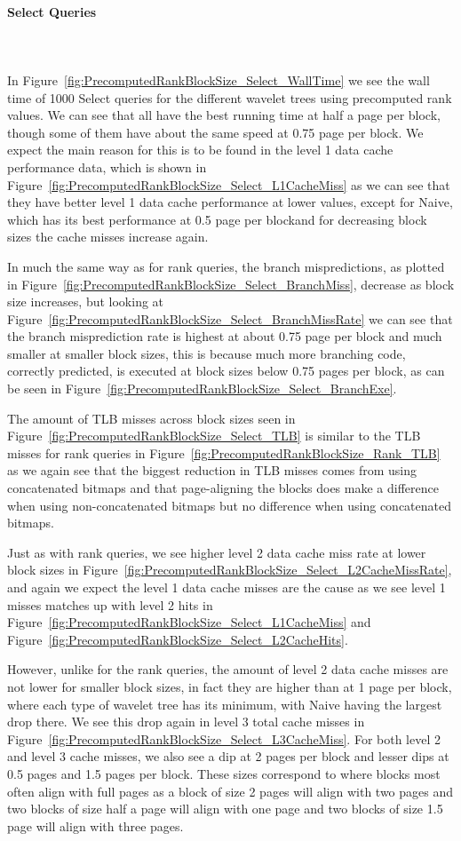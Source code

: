 \paragraph{Select Queries}~\\\\
In Figure~\ref{fig:PrecomputedRankBlockSize_Select_WallTime} we see the wall time of 1000 Select queries for the different wavelet trees using precomputed rank values.
We can see that all have the best running time at half a page per block, though some of them have about the same speed at 0.75 page per block.
We expect the main reason for this is to be found in the level 1 data cache performance data, which is shown in Figure~\ref{fig:PrecomputedRankBlockSize_Select_L1CacheMiss} as we can see that they have better level 1 data cache performance at lower values, except for Naive, which has its best performance at 0.5 page per blockand for decreasing block sizes the cache misses increase again.

In much the same way as for rank queries, the branch mispredictions, as plotted in Figure~\ref{fig:PrecomputedRankBlockSize_Select_BranchMiss}, decrease as block size increases, but looking at Figure~\ref{fig:PrecomputedRankBlockSize_Select_BranchMissRate} we can see that the branch misprediction rate is highest at about 0.75 page per block and much smaller at smaller block sizes, this is because much more branching code, correctly predicted, is executed at block sizes below 0.75 pages per block, as can be seen in Figure~\ref{fig:PrecomputedRankBlockSize_Select_BranchExe}.

The amount of TLB misses across block sizes seen in Figure~\ref{fig:PrecomputedRankBlockSize_Select_TLB} is similar to the TLB misses for rank queries in Figure~\ref{fig:PrecomputedRankBlockSize_Rank_TLB} as we again see that the biggest reduction in TLB misses comes from using concatenated bitmaps and that page-aligning the blocks does make a difference when using non-concatenated bitmaps but no difference when using concatenated bitmaps.

Just as with rank queries, we see higher level 2 data cache miss rate at lower block sizes in Figure~\ref{fig:PrecomputedRankBlockSize_Select_L2CacheMissRate}, and again we expect the level 1 data cache misses are the cause as we see level 1 misses matches up with level 2 hits in Figure~\ref{fig:PrecomputedRankBlockSize_Select_L1CacheMiss} and Figure~\ref{fig:PrecomputedRankBlockSize_Select_L2CacheHits}.

However, unlike for the rank queries, the amount of level 2 data cache misses are not lower for smaller block sizes, in fact they are higher than at 1 page per block, where each type of wavelet tree has its minimum, with Naive having the largest drop there.
We see this drop again in level 3 total cache misses in Figure~\ref{fig:PrecomputedRankBlockSize_Select_L3CacheMiss}.
For both level 2 and level 3 cache misses, we also see a dip at 2 pages per block and lesser dips at 0.5 pages and 1.5 pages per block. 
These sizes correspond to where blocks most often align with full pages as a block of size 2 pages will align with two pages and two blocks of size half a page will align with one page and two blocks of size 1.5 page will align with three pages.

